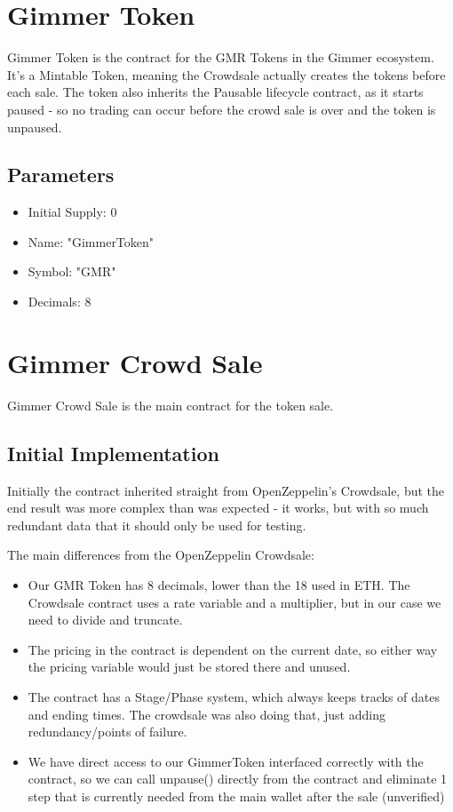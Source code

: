\documentclass[11pt]{article} %
\begin{document}
\section{Gimmer Token}

Gimmer Token is the contract for the GMR Tokens in the Gimmer ecosystem.
It's a Mintable Token, meaning the Crowdsale actually creates the tokens before each sale.
The token also inherits the Pausable lifecycle contract, as it starts paused - so no trading can occur before the crowd sale is over and the token is unpaused.

\subsection{Parameters}

\begin{itemize}
\item Initial Supply: 0
\item Name: "GimmerToken"
\item Symbol: "GMR"
\item Decimals: 8
\end{itemize}


\section{Gimmer Crowd Sale}

Gimmer Crowd Sale is the main contract for the token sale.

\subsection{Initial Implementation}
Initially the contract inherited straight from OpenZeppelin's Crowdsale, but the end result was more complex than was expected - it works, but with so much redundant data that it should only be used for testing.

The main differences from the OpenZeppelin Crowdsale:

\begin{itemize}
\item Our GMR Token has 8 decimals, lower than the 18 used in ETH. The Crowdsale contract uses a rate variable and a multiplier, but in our case we need to divide and truncate.
\item The pricing in the contract is dependent on the current date, so either way the pricing variable would just be stored there and unused.
\item The contract has a Stage/Phase system, which always keeps tracks of dates and ending times. The crowdsale was also doing that, just adding redundancy/points of failure.
\item We have direct access to our GimmerToken interfaced correctly with the contract, so we can call unpause() directly from the contract and eliminate 1 step that is currently needed from the main wallet after the sale (unverified)
\end{itemize}
\end{document}
